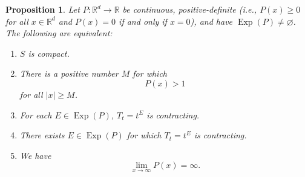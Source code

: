 \documentclass[11pt]{article}
\newtheorem{proposition}[theorem]{Proposition}
\newcommand\Exp{\operatorname{Exp}}
\begin{document}
\begin{proposition}\label{prop:PositiveHomogeneousCharacterization}
Let $P:\mathbb{R}^d\to\mathbb{R}$ be continuous, positive-definite (i.e., $P(x)\geq 0$ for all $x\in\mathbb{R}^d$ and $P(x)=0$ if and only if $x=0$), and have $\Exp(P)\neq \varnothing$. The following are equivalent:
\begin{enumerate}[label=(\alph*), ref=(\alph*)]
\item\label{cond:SisCompact} $S$ is compact.
\item\label{cond:PisAboveOne} There is a positive number $M$ for which
\begin{equation*}
P(x)>1
\end{equation*}
for all $|x|\geq M$. 
\item\label{cond:Contracting} For each $E\in\Exp(P)$, $T_t=t^E$ is contracting.
\item\label{cond:ThereExistsContracting} There exists $E\in\Exp(P)$ for which $T_t=t^E$ is contracting.
\item\label{cond:InfiniteLimit} We have
\begin{equation*}
\lim_{x\to\infty}P(x)=\infty.
\end{equation*}
\end{enumerate}
\end{proposition}
\end{document}
